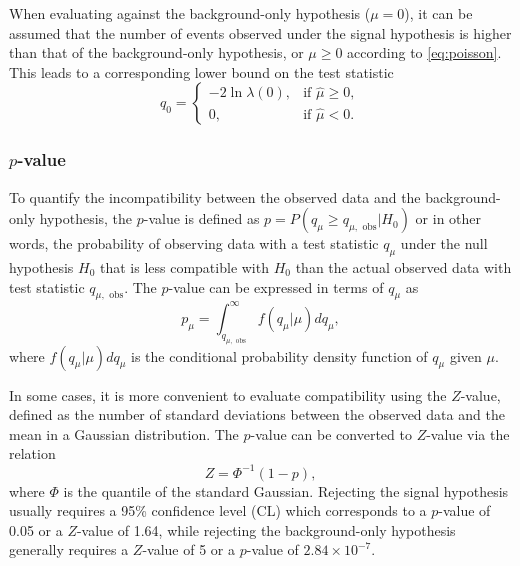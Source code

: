 \documentclass[../thesis.tex]{subfiles}
\begin{document}
When evaluating against the background-only hypothesis ($\mu=0$), it can be assumed that the number of events observed under the signal hypothesis is higher than that of the background-only hypothesis, or $\mu\geq 0$ according to \autoref{eq:poisson}. This leads to a corresponding lower bound on the test statistic
\begin{equation}
  q_0=\begin{cases}
    -2\ln \lambda(0), & \text{if $\hat{\mu}\geq 0$},\\
    0, & \text{if $\hat{\mu}< 0$}.
  \end{cases}
\end{equation} 

\subsubsection*{$p$-value}
To quantify the incompatibility between the observed data and the background-only hypothesis, the $p$-value is defined as $p=P(q_\mu \geq q_{\mu,\text{ obs}}|H_0)$ or in other words, the probability of observing data with a test statistic $q_\mu$ under the null hypothesis $H_0$ that is less compatible with $H_0$ than the actual observed data with test statistic $q_{\mu,\text{ obs}}$. The $p$-value can be expressed in terms of $q_\mu$ as
\begin{equation}
p_\mu = \displaystyle\int^{\infty}_{q_{\mu,\text{ obs}}} f(q_\mu | \mu) dq_\mu,
\end{equation}
where $f(q_\mu | \mu) dq_\mu$ is the conditional probability density function of $q_\mu$ given $\mu$. 

In some cases, it is more convenient to evaluate compatibility using the $Z$-value, defined as the number of standard deviations between the observed data and the mean in a Gaussian distribution. The $p$-value can be converted to $Z$-value via the relation
\begin{equation}
Z=\Phi^{-1}(1-p),
\end{equation}
where $\Phi$ is the quantile of the standard Gaussian. Rejecting the signal hypothesis usually requires a 95\% confidence level (\acs{CL}) which corresponds to a $p$-value of 0.05 or a $Z$-value of 1.64, while rejecting the background-only hypothesis generally requires a $Z$-value of 5 or a $p$-value of $2.84\times 10^{-7}$.


\end{document}
